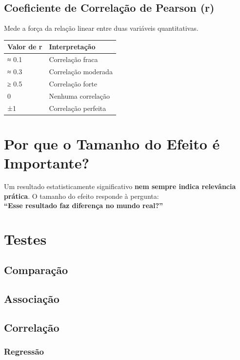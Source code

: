 \documentclass[
]{book}
\begin{document}
\subsection{Coeficiente de Correlação de Pearson (r)}\label{coeficiente-de-correlauxe7uxe3o-de-pearson-r}

Mede a força da relação linear entre duas variáveis quantitativas.

\begin{longtable}[]{@{}ll@{}}
\toprule\noalign{}
Valor de r & Interpretação \\
\midrule\noalign{}
\endhead
\bottomrule\noalign{}
\endlastfoot
≈ 0.1 & Correlação fraca \\
≈ 0.3 & Correlação moderada \\
≥ 0.5 & Correlação forte \\
0 & Nenhuma correlação \\
±1 & Correlação perfeita \\
\end{longtable}

\section{Por que o Tamanho do Efeito é Importante?}\label{por-que-o-tamanho-do-efeito-uxe9-importante}

Um resultado estatisticamente significativo \textbf{nem sempre indica relevância prática}. O tamanho do efeito responde à pergunta:\\
\textbf{``Esse resultado faz diferença no mundo real?''}

\section{Testes}\label{testes}

\subsection{Comparação}\label{comparauxe7uxe3o}

\subsection{Associação}\label{associauxe7uxe3o}

\subsection{Correlação}\label{correlauxe7uxe3o}

\subsubsection{Regressão}\label{regressuxe3o}

  
\end{document}
